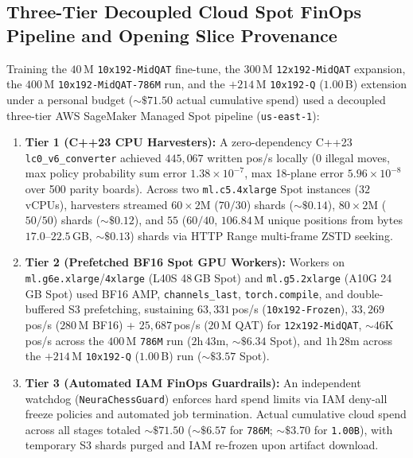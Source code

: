 \documentclass[10pt,twocolumn]{article}
\begin{document}
\subsection{Three-Tier Decoupled Cloud Spot FinOps Pipeline and Opening Slice Provenance}
\label{app:finops}
Training the $40$\,M \texttt{10x192-MidQAT} fine-tune, the $300$\,M \texttt{12x192-MidQAT} expansion, the $400$\,M \texttt{10x192-MidQAT-786M} run, and the $+214$\,M \texttt{10x192-Q} ($1.00$\,B) extension under a personal budget (${\sim}\$71.50$ actual cumulative spend) used a decoupled three-tier AWS SageMaker Managed Spot pipeline (\texttt{us-east-1}):
\begin{enumerate}
  \item \textbf{Tier 1 (C++23 CPU Harvesters):} A zero-dependency C++23 \texttt{lc0\_v6\_converter} achieved $445{,}067$ written pos/s locally ($0$ illegal moves, max policy probability sum error $1.38 \times 10^{-7}$, max 18-plane error $5.96 \times 10^{-8}$ over 500 parity boards). Across two \texttt{ml.c5.4xlarge} Spot instances ($32$ vCPUs), harvesters streamed $60 \times 2\text{M}$ ($70/30$) shards (${\sim}\$0.14$), $80 \times 2\text{M}$ ($50/50$) shards (${\sim}\$0.12$), and $55$ ($60/40$, $106.84$\,M unique positions from bytes $17.0\text{--}22.5$\,GB, ${\sim}\$0.13$) shards via HTTP Range multi-frame ZSTD seeking.
  \item \textbf{Tier 2 (Prefetched BF16 Spot GPU Workers):} Workers on \texttt{ml.g6e.xlarge}/\texttt{4xlarge} (L40S 48\,GB Spot) and \texttt{ml.g5.2xlarge} (A10G 24\,GB Spot) used BF16 AMP, \texttt{channels\_last}, \texttt{torch.compile}, and double-buffered S3 prefetching, sustaining $63{,}331$\,pos/s (\texttt{10x192-Frozen}), $33{,}269$\,pos/s ($280$\,M BF16) + $25{,}687$\,pos/s ($20$\,M QAT) for \texttt{12x192-MidQAT}, ${\sim}46\text{K}$\,pos/s across the $400$\,M \texttt{786M} run ($2\text{h}\,43\text{m}$, ${\sim}\$6.34$ Spot), and $1\text{h}\,28\text{m}$ across the $+214$\,M \texttt{10x192-Q} ($1.00$\,B) run (${\sim}\$3.57$ Spot).
  \item \textbf{Tier 3 (Automated IAM FinOps Guardrails):} An independent watchdog (\texttt{NeuraChessGuard}) enforces hard spend limits via IAM deny-all freeze policies and automated job termination. Actual cumulative cloud spend across all stages totaled ${\sim}\$71.50$ (${\sim}\$6.57$ for \texttt{786M}; ${\sim}\$3.70$ for \texttt{1.00B}), with temporary S3 shards purged and IAM re-frozen upon artifact download.
\end{enumerate}
\end{document}
